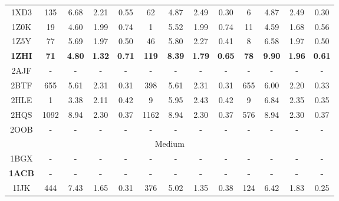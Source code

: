 \begin{longtable}{c c c c c|c c c c|c c c c}
 {\tiny 1XD3} &{\tiny 135}&{\tiny 6.68}&{\tiny 2.21}&{\tiny 0.55} &{\tiny 62}&{\tiny 4.87}&{\tiny 2.49}&{\tiny 0.30} &{\tiny 6}&{\tiny 4.87}&{\tiny 2.49}&{\tiny 0.30}\\ 
 {\tiny 1Z0K} &{\tiny 19}&{\tiny 4.60}&{\tiny 1.99}&{\tiny 0.74} &{\tiny 1}&{\tiny 5.52}&{\tiny 1.99}&{\tiny 0.74} &{\tiny 11}&{\tiny 4.59}&{\tiny 1.68}&{\tiny 0.56}\\ 
 {\tiny 1Z5Y} &{\tiny 77}&{\tiny 5.69}&{\tiny 1.97}&{\tiny 0.50} &{\tiny 46}&{\tiny 5.80}&{\tiny 2.27}&{\tiny 0.41} &{\tiny 8}&{\tiny 6.58}&{\tiny 1.97}&{\tiny 0.50}\\ 
 \textbf{\tiny 1ZHI} &\textbf{\tiny 71}&\textbf{\tiny 4.80}&\textbf{\tiny 1.32}&\textbf{\tiny 0.71} &\textbf{\tiny 119}&\textbf{\tiny 8.39}&\textbf{\tiny 1.79}&\textbf{\tiny 0.65} &\textbf{\tiny 78}&\textbf{\tiny 9.90}&\textbf{\tiny 1.96}&\textbf{\tiny 0.61}\\ 
 {\tiny 2AJF} &{\tiny -}&{\tiny -}&{\tiny -}&{\tiny -} &{\tiny -}&{\tiny -}&{\tiny -}&{\tiny -} &{\tiny -}&{\tiny -}&{\tiny -}&{\tiny -}\\ 
 {\tiny 2BTF} &{\tiny 655}&{\tiny 5.61}&{\tiny 2.31}&{\tiny 0.31} &{\tiny 398}&{\tiny 5.61}&{\tiny 2.31}&{\tiny 0.31} &{\tiny 655}&{\tiny 6.00}&{\tiny 2.20}&{\tiny 0.33}\\ 
 {\tiny 2HLE} &{\tiny 1}&{\tiny 3.38}&{\tiny 2.11}&{\tiny 0.42} &{\tiny 9}&{\tiny 5.95}&{\tiny 2.43}&{\tiny 0.42} &{\tiny 9}&{\tiny 6.84}&{\tiny 2.35}&{\tiny 0.35}\\ 
 {\tiny 2HQS} &{\tiny 1092}&{\tiny 8.94}&{\tiny 2.30}&{\tiny 0.37} &{\tiny 1162}&{\tiny 8.94}&{\tiny 2.30}&{\tiny 0.37} &{\tiny 576}&{\tiny 8.94}&{\tiny 2.30}&{\tiny 0.37}\\ 
 {\tiny 2OOB} &{\tiny -}&{\tiny -}&{\tiny -}&{\tiny -} &{\tiny -}&{\tiny -}&{\tiny -}&{\tiny -} &{\tiny -}&{\tiny -}&{\tiny -}&{\tiny -}\\ 
 \multicolumn{13}{c}{Medium}\\
{\tiny 1BGX} &{\tiny -}&{\tiny -}&{\tiny -}&{\tiny -} &{\tiny -}&{\tiny -}&{\tiny -}&{\tiny -} &{\tiny -}&{\tiny -}&{\tiny -}&{\tiny -}\\ 
 \textbf{\tiny 1ACB} &\textbf{\tiny -}&\textbf{\tiny -}&\textbf{\tiny -}&\textbf{\tiny -} &\textbf{\tiny -}&\textbf{\tiny -}&\textbf{\tiny -}&\textbf{\tiny -} &\textbf{\tiny -}&\textbf{\tiny -}&\textbf{\tiny -}&\textbf{\tiny -}\\ 
 {\tiny 1IJK} &{\tiny 444}&{\tiny 7.43}&{\tiny 1.65}&{\tiny 0.31} &{\tiny 376}&{\tiny 5.02}&{\tiny 1.35}&{\tiny 0.38} &{\tiny 124}&{\tiny 6.42}&{\tiny 1.83}&{\tiny 0.25}\\ 

\end{longtable}
